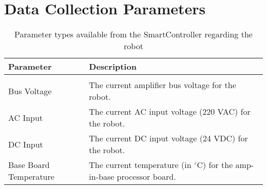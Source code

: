 \chapter{Data Collection Parameters} \label{AppendixB}
\begin{table}[ht]
\begin{center}
\caption[Parameter types available from the SmartController regarding the robot]{Parameter types available from the SmartController regarding the robot} \vspace{0.3cm}
\label{tab:Robot Data Types}
\begin{tabular}[width=\textwidth]{ p{} | p{}}
Parameter & Description \\ [1ex]
\hline \\
\parbox[t]{0.3\textwidth}{Bus Voltage} & The current amplifier bus voltage for the robot. \\ [2ex]
\parbox[t]{0.3\textwidth}{AC Input} & The current AC input voltage (220 VAC) for the robot. \\ [2ex]
\parbox[t]{0.3\textwidth}{DC Input} & The current DC input voltage (24 VDC) for the robot.\\ [2ex]
\parbox[t]{0.3\textwidth}{Base Board Temperature} &  The current temperature (in $^\circ$C) for the amp-in-base processor board. \\
\end{tabular}
\end{center}
\end{table}

